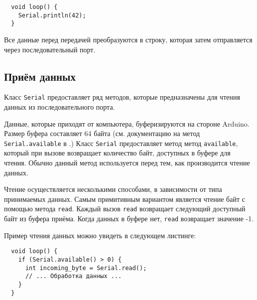 \documentclass[../sparc.tex]{subfiles}
\begin{document}
\begin{verbatim}
  void loop() {
    Serial.println(42);
  }
\end{verbatim}

Все данные перед передачей преобразуются в строку, которая затем отправляется
через последовательный порт.

\subsection{Приём данных}

Класс \texttt{Serial} предоставляет ряд методов, которые предназначены для
чтения данных из последовательного порта.

Данные, которые приходят от компьютера, буферизируются на стороне Arduino.
Размер буфера составляет 64 байта (см. документацию на метод
\texttt{Serial.available} в \cite{arduino:reference}.)  Класс \texttt{Serial}
предоставляет метод метод \texttt{available}, который при вызове возвращает
количество байт, доступных в буфере для чтения.  Обычно данный метод
используется перед тем, как производится чтение данных.

Чтение осуществляется несколькими способами, в зависимости от типа принимаемых
данных.  Самым примитивным вариантом является чтение байт с помощью метода
\texttt{read}.  Каждый вызов \texttt{read} возвращает следующий доступный байт
из буфера приёма.  Когда данных в буфере нет, \texttt{read} возвращает значение
-1.


Пример чтения данных можно увидеть в следующем листинге:

\begin{verbatim}
  void loop() {
    if (Serial.available() > 0) {
      int incoming_byte = Serial.read();
      // ... Обработка данных ...
    }
  }
\end{verbatim}
\end{document}
